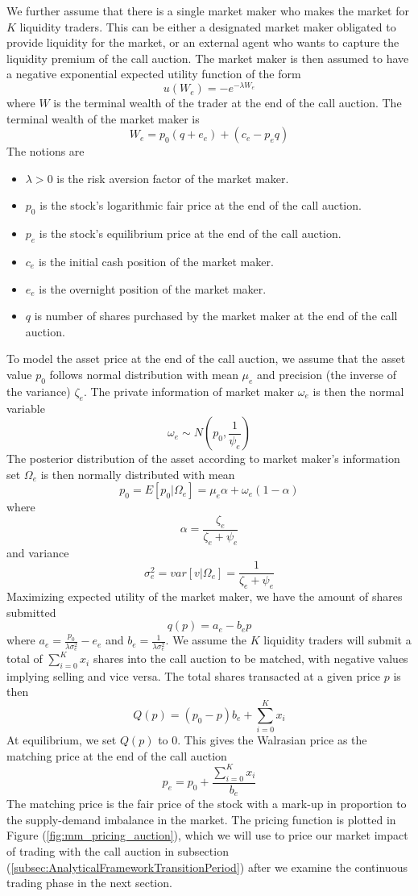 \documentclass{article}
\begin{document}
We further assume that there is a single market maker who makes the market for $K$ liquidity traders. This can be either a designated market maker obligated to provide liquidity for the market, or an external agent who wants to capture the liquidity premium of the call auction. The market maker is then assumed to have a negative exponential expected utility function of the form
\[
  u(W_e) = -e^{-\lambda W_e}
\]
where $W$ is the terminal wealth of the trader at the end of the call auction. The terminal wealth of the market maker is
\[
  W_e = p_0 (q + e_e) + (c_e - p_e q)
\]
The notions are
\begin{itemize}
  \item $\lambda>0$ is the risk aversion factor of the market maker.
  \item $p_0$ is the stock's logarithmic fair price at the end of the call auction.
  \item $p_e$ is the stock's equilibrium price at the end of the call auction.
  \item $c_e$ is the initial cash position of the market maker.
  \item $e_e$ is the overnight position of the market maker.
  \item $q$ is number of shares purchased by the market maker at the end of the call auction.
\end{itemize}
To model the asset price at the end of the call auction, we assume that the asset value $p_0$ follows normal distribution with mean $\mu_e$ and precision (the inverse of the variance) $\zeta_e$. The private information of market maker $\omega_e$ is then the normal variable
\[
  \omega_e \sim N(p_0, \frac{1}{\psi_e})
\]
The posterior distribution of the asset according to market maker's information set $\Omega_e$ is then normally distributed with mean
\[
  p_0=E[p_0|\Omega_e]=\mu_e \alpha + \omega_e(1 - \alpha)
\]
where
\[
  \alpha = \frac{\zeta_e}{\zeta_e+\psi_e}
\]
and variance
\[
  \sigma_e^2=var[v|\Omega_e]=\frac{1}{\zeta_e+\psi_e}
\]
Maximizing expected utility of the market maker, we have the amount of shares submitted
\[
  q(p) = a_e - b_e p
\]
where $a_e = \frac{p_0}{\lambda \sigma_e^2} - e_e$ and $b_e=\frac{1}{\lambda \sigma_e^2}$. We assume the $K$ liquidity traders will submit a total of $\sum_{i=0}^K x_i$ shares into the call auction to be matched, with negative values implying selling and vice versa. The total shares transacted at a given price $p$ is then
\[
  Q(p) = (p_0 - p) b_e + \sum_{i=0}^K x_i
\]
At equilibrium, we set $Q(p)$ to 0. This gives the Walrasian price as the matching price at the end of the call auction
\begin{equation}\label{markup_px_eqb}
  p_e = p_0 + \frac{\sum_{i=0}^K x_i}{b_e}
\end{equation}
The matching price is the fair price of the stock with a mark-up in proportion to the supply-demand imbalance in the market. The pricing function is plotted in Figure (\ref{fig:mm_pricing_auction}), which we will use to price our market impact of trading with the call auction in subsection (\ref{subsec:AnalyticalFrameworkTransitionPeriod}) after we examine the continuous trading phase in the next section.
\end{document}
